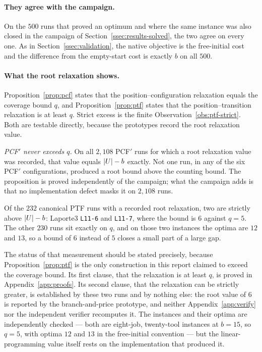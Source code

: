 \paragraph{They agree with the campaign.}
On the $500$ runs that proved an optimum and where the same instance was also closed in
the campaign of Section~\ref{ssec:results-solved}, the two agree on every one. As in
Section~\ref{ssec:validation}, the native objective is the free-initial cost and the
difference from the empty-start cost is exactly $b$ on all $500$.

\paragraph{What the root relaxation shows.}
Proposition~\ref{prop:pcf} states that the position--configuration relaxation equals
the coverage bound $q$, and Proposition~\ref{prop:ptf} states that the
position--transition relaxation is at least $q$. Strict excess is the finite
Observation~\ref{obs:ptf-strict}. Both are testable directly, because the
prototypes record the root relaxation value.

\emph{PCF$'$ never exceeds $q$.} On all $2{,}108$ PCF$'$ runs for which a root
relaxation value was recorded, that value equals $\lvert U\rvert-b$ exactly. Not one
run, in any of the six PCF$'$ configurations, produced a root bound above the counting
bound. The proposition is proved independently of the campaign; what the campaign adds
is that no implementation defect masks it on $2{,}108$ runs.

\begin{observation}\label{obs:ptf-strict}
Of the $232$ canonical PTF runs with a recorded root relaxation, two are strictly above
$\lvert U\rvert-b$: Laporte3 \texttt{L11-6} and \texttt{L11-7}, where the bound is $6$
against $q=5$. The other $230$ runs sit exactly on $q$, and on those two instances the
optima are $12$ and $13$, so a bound of $6$ instead of $5$ closes a small part of a
large gap.
\end{observation}

The status of that measurement should be stated precisely, because
Proposition~\ref{prop:ptf} is the only construction in this report claimed to exceed the
coverage bound. Its first clause, that the relaxation is at least $q$, is proved in
Appendix~\ref{app:proofs}. Its second clause, that the relaxation can be strictly greater,
is established by these two runs and by nothing else: the root value of $6$ is reported by
the branch-and-price prototype, and neither Appendix~\ref{app:verify} nor the independent
verifier recomputes it. The instances and their optima are independently checked --- both
are eight-job, twenty-tool instances at $b=15$, so $q=5$, with optima $12$ and $13$ in the
free-initial convention --- but the linear-programming value itself rests on the
implementation that produced it.

